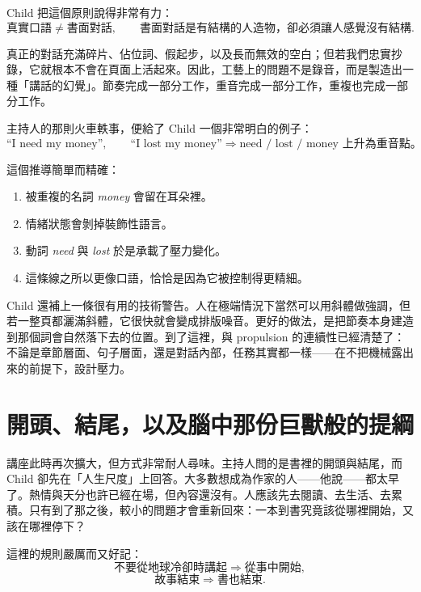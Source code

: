 Child 把這個原則說得非常有力：
\begin{equation}
\text{真實口語} \neq \text{書面對話},
\qquad
\text{書面對話是有結構的人造物，卻必須讓人感覺沒有結構}.
\end{equation}

真正的對話充滿碎片、佔位詞、假起步，以及長而無效的空白；但若我們忠實抄錄，它就根本不會在頁面上活起來。因此，工藝上的問題不是錄音，而是製造出一種「講話的幻覺」。節奏完成一部分工作，重音完成一部分工作，重複也完成一部分工作。

主持人的那則火車軼事，便給了 Child 一個非常明白的例子：
\begin{equation}
\text{``I need my money''}, \qquad \text{``I lost my money''}
\Longrightarrow
\text{need / lost / money 上升為重音點。}
\end{equation}

這個推導簡單而精確：
\begin{enumerate}
\item 被重複的名詞 \emph{money} 會留在耳朵裡。
\item 情緒狀態會剝掉裝飾性語言。
\item 動詞 \emph{need} 與 \emph{lost} 於是承載了壓力變化。
\item 這條線之所以更像口語，恰恰是因為它被控制得更精細。
\end{enumerate}

Child 還補上一條很有用的技術警告。人在極端情況下當然可以用斜體做強調，但若一整頁都灑滿斜體，它很快就會變成排版噪音。更好的做法，是把節奏本身建造到那個詞會自然落下去的位置。到了這裡，與 propulsion 的連續性已經清楚了：不論是章節層面、句子層面，還是對話內部，任務其實都一樣——在不把機械露出來的前提下，設計壓力。

\section{開頭、結尾，以及腦中那份巨獸般的提綱}

講座此時再次擴大，但方式非常耐人尋味。主持人問的是書裡的開頭與結尾，而 Child 卻先在「人生尺度」上回答。大多數想成為作家的人——他說——都太早了。熱情與天分也許已經在場，但內容還沒有。人應該先去閱讀、去生活、去累積。只有到了那之後，較小的問題才會重新回來：一本到書究竟該從哪裡開始，又該在哪裡停下？

這裡的規則嚴厲而又好記：
\begin{equation}
\text{不要從地球冷卻時講起} \Longrightarrow \textit{從事中開始},
\end{equation}
\begin{equation}
\text{故事結束} \Longrightarrow \text{書也結束}.
\end{equation}

